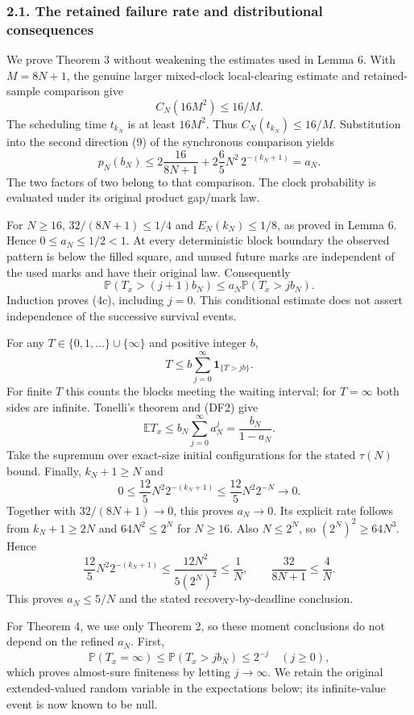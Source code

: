 \documentclass[
  11pt,
  a4paper,
]{article}
\begin{document}
\subsubsection{2.1. The retained failure rate and distributional
consequences}\label{the-retained-failure-rate-and-distributional-consequences}

We prove Theorem 3 without weakening the estimates used in Lemma 6. With
\(M=8N+1\), the genuine larger mixed-clock local-clearing estimate and
retained-sample comparison give \[
C_N(16M^2)\leq16/M.
\] The scheduling time \(t_{k_N}\) is at least \(16M^2\). Thus
\(C_N(t_{k_N})\leq16/M\). Substitution into the second direction (9) of
the synchronous comparison yields \[
p_N(b_N)\leq2\frac{16}{8N+1}
  +2\frac65N^2\,2^{-(k_N+1)}=a_N.
\tag{DF1}
\] The two factors of two belong to that comparison. The clock
probability is evaluated under its original product gap/mark law.

For \(N\geq16\), \(32/(8N+1)\leq1/4\) and \(E_N(k_N)\leq1/8\), as proved
in Lemma 6. Hence \(0\leq a_N\leq1/2<1\). At every deterministic block
boundary the observed pattern is below the filled square, and unused
future marks are independent of the used marks and have their original
law. Consequently \[
\mathbb P(T_x>(j+1)b_N)\leq
 a_N\mathbb P(T_x>jb_N).
\tag{DF2}
\] Induction proves (4c), including \(j=0\). This conditional estimate
does not assert independence of the successive survival events.

For any \(T\in\{0,1,\ldots\}\cup\{\infty\}\) and positive integer \(b\),
\[
T\leq b\sum_{j=0}^{\infty}\mathbf1_{\{T>jb\}}.
\tag{DF3}
\] For finite \(T\) this counts the blocks meeting the waiting interval;
for \(T=\infty\) both sides are infinite. Tonelli's theorem and (DF2)
give \[
\mathbb E T_x\leq b_N\sum_{j=0}^{\infty}a_N^j
=\frac{b_N}{1-a_N}.
\] Take the supremum over exact-size initial configurations for the
stated \(\tau(N)\) bound. Finally, \(k_N+1\geq N\) and \[
0\leq\frac{12}{5}N^2 2^{-(k_N+1)}
\leq\frac{12}{5}N^2 2^{-N}\longrightarrow0.
\] Together with \(32/(8N+1)\to0\), this proves \(a_N\to0\). Its
explicit rate follows from \(k_N+1\geq2N\) and \(64N^2\leq2^N\) for
\(N\geq16\). Also \(N\leq2^N\), so \((2^N)^2\geq64N^3\). Hence \[
\frac{12}{5}N^2 2^{-(k_N+1)}
\leq\frac{12N^2}{5(2^N)^2}\leq\frac1N,
\qquad \frac{32}{8N+1}\leq\frac4N.
\] This proves \(a_N\leq5/N\) and the stated recovery-by-deadline
conclusion.

For Theorem 4, we use only Theorem 2, so these moment conclusions do not
depend on the refined \(a_N\). First, \[
\mathbb P(T_x=\infty)\leq\mathbb P(T_x>jb_N)\leq2^{-j}
\quad(j\geq0),
\] which proves almost-sure finiteness by letting \(j\to\infty\). We
retain the original extended-valued random variable in the expectations
below; its infinite-value event is now known to be null.
\end{document}

